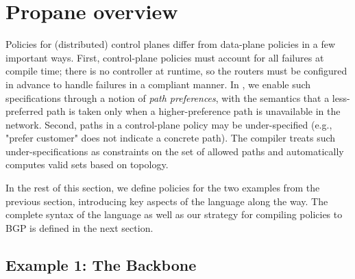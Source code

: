 \section{Propane overview}
\label{sec:propane}

Policies for (distributed) control planes differ from data-plane
policies in a few important ways. First, control-plane
policies must account for all failures at compile time; there is
no controller at runtime, so the routers must be configured in advance to handle failures in a compliant manner.
%
In \sysname, we enable such specifications through a notion of {\em path preferences}, with the semantics that a less-preferred path is taken only when a higher-preference path is unavailable in the network.
%
Second, paths in a control-plane policy may be under-specified (e.g.,
"prefer customer" does not indicate a concrete path). The \sysname
compiler treats such under-specifications as constraints on the set of
allowed paths and automatically computes valid sets based on topology.
%

In the rest of this section, we define \sysname policies for the two 
examples from the previous section, introducing key aspects of
the \sysname language along the way. The complete syntax of the
language as well as our strategy for compiling \sysname policies to
BGP is defined in the next section.

\subsection{Example 1: The Backbone}


